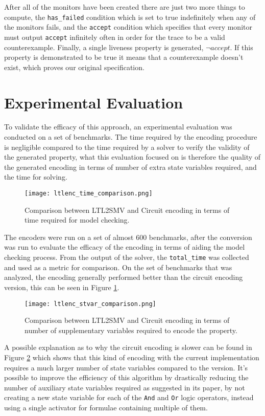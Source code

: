 After all of the monitors have been created there are just two more things to compute, the \texttt{has\_failed} condition which is set to true indefinitely when any of the monitors fails, and the \texttt{accept} condition which specifies that every monitor must output \texttt{accept} infinitely often in order for the trace to be a valid counterexample.
Finally, a single liveness property is generated, $\lnot \mathit{accept}$.
If this property is demonstrated to be true it means that a counterexample doesn't exist, which proves our original specification.


\section{Experimental Evaluation}

To validate the efficacy of this approach, an experimental evaluation was conducted on a set of benchmarks.
The time required by the encoding procedure is negligible compared to the time required by a solver to verify the validity of the generated property, what this evaluation focused on is therefore the quality of the generated encoding in terms of number of extra state variables required, and the time for solving.

\begin{figure}
    \texttt{[image: ltlenc\_time\_comparison.png]}
    \caption{Comparison between LTL2SMV and Circuit encoding in terms of time required for model checking.}
    \label{fig:ltlenc_time_comparison}
\end{figure}

The encoders were run on a set of almost 600 benchmarks, after the conversion \iceia{} was run to evaluate the efficacy of the encoding in terms of aiding the model checking process.
From the output of the solver, the \texttt{total\_time} was collected and used as a metric for comparison.
On the set of benchmarks that was analyzed, the \ltltosmv{} encoding generally performed better than the circuit encoding version, this can be seen in Figure \ref{fig:ltlenc_time_comparison}.

\begin{figure}
    \texttt{[image: ltlenc\_stvar\_comparison.png]}
    \caption{Comparison between LTL2SMV and Circuit encoding in terms of number of supplementary variables required to encode the property.}
    \label{fig:ltlenc_stvar_comparison}
\end{figure}

A possible explanation as to why the circuit encoding is slower can be found in Figure \ref{fig:ltlenc_stvar_comparison} which shows that this kind of encoding with the current implementation requires a much larger number of state variables compared to the \ltltosmv{} version.
It's possible to improve the efficiency of this algorithm by drastically reducing the number of auxiliary state variables required as suggested in its paper, by not creating a new state variable for each of the \texttt{And} and \texttt{Or} logic operators, instead using a single activator for formulae containing multiple of them.
\FloatBarrier{}


